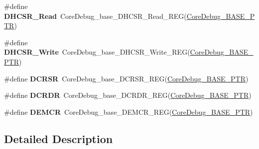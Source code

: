 \begin{DoxyCompactItemize}
\mbox{\label{group___core_debug___register___accessor___macros_ga7d77eafe76b2000c7159e58e11ade9a1}} 
\#define {\bfseries D\+H\+C\+S\+R\+\_\+\+Read}~Core\+Debug\+\_\+base\+\_\+\+D\+H\+C\+S\+R\+\_\+\+Read\+\_\+\+R\+EG(\hyperlink{group___core_debug___peripheral_ga994a185afca30ede538d89322c4f0326}{Core\+Debug\+\_\+\+B\+A\+S\+E\+\_\+\+P\+TR})
\item 
\mbox{\label{group___core_debug___register___accessor___macros_ga3c374ff0f88587d03fd707ebc0a06169}} 
\#define {\bfseries D\+H\+C\+S\+R\+\_\+\+Write}~Core\+Debug\+\_\+base\+\_\+\+D\+H\+C\+S\+R\+\_\+\+Write\+\_\+\+R\+EG(\hyperlink{group___core_debug___peripheral_ga994a185afca30ede538d89322c4f0326}{Core\+Debug\+\_\+\+B\+A\+S\+E\+\_\+\+P\+TR})
\item 
\mbox{\label{group___core_debug___register___accessor___macros_gabd5ddab120c0e09c0198d49c25713be3}} 
\#define {\bfseries D\+C\+R\+SR}~Core\+Debug\+\_\+base\+\_\+\+D\+C\+R\+S\+R\+\_\+\+R\+EG(\hyperlink{group___core_debug___peripheral_ga994a185afca30ede538d89322c4f0326}{Core\+Debug\+\_\+\+B\+A\+S\+E\+\_\+\+P\+TR})
\item 
\mbox{\label{group___core_debug___register___accessor___macros_gaaa7a4f8f79faea1305f3398257c656a0}} 
\#define {\bfseries D\+C\+R\+DR}~Core\+Debug\+\_\+base\+\_\+\+D\+C\+R\+D\+R\+\_\+\+R\+EG(\hyperlink{group___core_debug___peripheral_ga994a185afca30ede538d89322c4f0326}{Core\+Debug\+\_\+\+B\+A\+S\+E\+\_\+\+P\+TR})
\item 
\mbox{\label{group___core_debug___register___accessor___macros_gab6c5b1baf444f12ba50bfc3b0e40e05c}} 
\#define {\bfseries D\+E\+M\+CR}~Core\+Debug\+\_\+base\+\_\+\+D\+E\+M\+C\+R\+\_\+\+R\+EG(\hyperlink{group___core_debug___peripheral_ga994a185afca30ede538d89322c4f0326}{Core\+Debug\+\_\+\+B\+A\+S\+E\+\_\+\+P\+TR})
\end{DoxyCompactItemize}


\subsection{Detailed Description}
